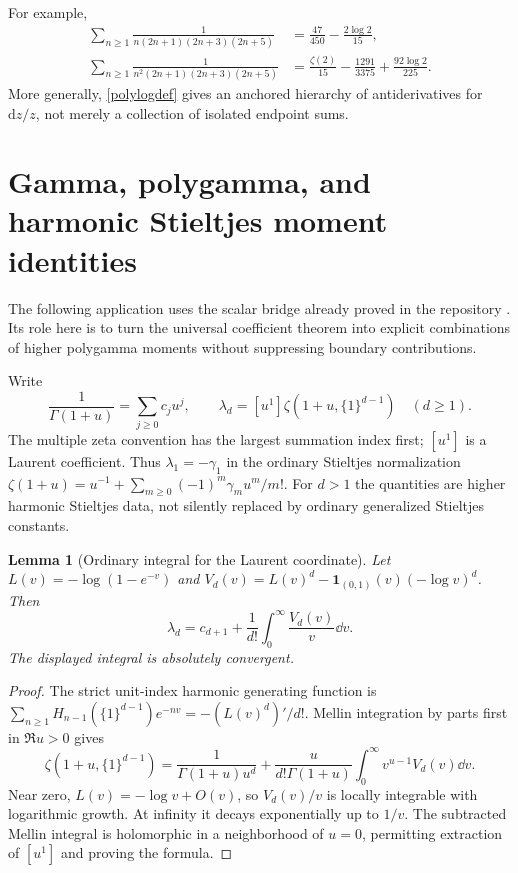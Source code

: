 \documentclass[11pt]{article}
\numberwithin{equation}{section}
\newtheorem{lemma}[theorem]{Lemma}
\theoremstyle{definition}\newtheorem{definition}[theorem]{Definition}
\theoremstyle{remark}\newtheorem{remark}[theorem]{Remark}
\begin{document}
For example,
\begin{align}
 \sum_{n\ge1}\frac1{n(2n+1)(2n+3)(2n+5)}
 &=\frac{47}{450}-\frac{2\log2}{15},\label{pexample1}\\
 \sum_{n\ge1}\frac1{n^2(2n+1)(2n+3)(2n+5)}
 &=\frac{\zeta(2)}{15}-\frac{1291}{3375}
       +\frac{92\log2}{225}.\label{pexample2}
\end{align}
More generally, \eqref{polylogdef} gives an anchored hierarchy of antiderivatives for $\mathrm dz/z$, not merely a collection of isolated endpoint sums.

\section{Gamma, polygamma, and harmonic Stieltjes moment identities}
The following application uses the scalar bridge already proved in the repository \cite{moments}. Its role here is to turn the universal coefficient theorem into explicit combinations of higher polygamma moments without suppressing boundary contributions.

Write
\[
 \frac1{\Gamma(1+u)}=\sum_{j\ge0}c_ju^j,\qquad
 \lambda_d=[u^1]\zeta(1+u,\{1\}^{d-1})\quad(d\ge1).
\]
The multiple zeta convention has the largest summation index first; $[u^1]$ is a Laurent coefficient. Thus $\lambda_1=-\gamma_1$ in the ordinary Stieltjes normalization
$\zeta(1+u)=u^{-1}+\sum_{m\ge0}(-1)^m\gamma_mu^m/m!$.
For $d>1$ the quantities are higher harmonic Stieltjes data, not silently replaced by ordinary generalized Stieltjes constants.

\begin{lemma}[Ordinary integral for the Laurent coordinate]\label{lambda}
Let $L(v)=-\log(1-e^{-v})$ and
$V_d(v)=L(v)^d-\mathbf1_{(0,1)}(v)(-\log v)^d$. Then
\begin{equation}\label{lambdaintegral}
 \lambda_d=c_{d+1}+\frac1{d!}\int_0^\infty\frac{V_d(v)}v\dd v.
\end{equation}
The displayed integral is absolutely convergent.
\end{lemma}
\begin{proof}
The strict unit-index harmonic generating function is
$\sum_{n\ge1}H_{n-1}(\{1\}^{d-1})e^{-nv}=-(L(v)^d)'/d!$.
Mellin integration by parts first in $\Re u>0$ gives
\[
 \zeta(1+u,\{1\}^{d-1})
 =\frac1{\Gamma(1+u)u^d}
 +\frac{u}{d!\Gamma(1+u)}\int_0^\infty v^{u-1}V_d(v)\dd v.
\]
Near zero, $L(v)=-\log v+O(v)$, so $V_d(v)/v$ is locally integrable with logarithmic growth. At infinity it decays exponentially up to $1/v$. The subtracted Mellin integral is holomorphic in a neighborhood of $u=0$, permitting extraction of $[u^1]$ and proving the formula.
\end{proof}
\end{document}
